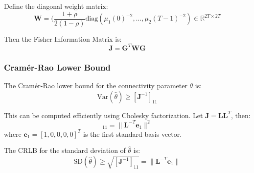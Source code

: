 Define the diagonal weight matrix:
\begin{equation*}
\mathbf{W} = (\frac{1+\rho}{2(1-\rho)} \text{diag}\left( \mu_1(0)^{-2}, \ldots, \mu_2(T-1)^{-2}\right) \in \mathbb{R}^{2T \times 2T}
\end{equation*}

Then the Fisher Information Matrix is:
\begin{equation*}
\mathbf{J} = \mathbf{G}^T \mathbf{W} \mathbf{G}
\end{equation*}

\subsubsection{Cramér-Rao Lower Bound}

The Cramér-Rao lower bound for the connectivity parameter $\theta$ is:
\begin{equation*}
\text{Var}(\hat{\theta}) \geq [\mathbf{J}^{-1}]_{11}
\end{equation*}

This can be computed efficiently using Cholesky factorization. Let $\mathbf{J} = \mathbf{L}\mathbf{L}^T$, then:
\begin{equation*}
[\mathbf{J}^{-1}]_{11} = \|\mathbf{L}^{-T}\mathbf{e}_1\|^2
\end{equation*}
where $\mathbf{e}_1 = [1, 0, 0, 0, 0]^T$ is the first standard basis vector.

The CRLB for the standard deviation of $\hat{\theta}$ is:
\begin{equation*}
\text{SD}(\hat{\theta}) \geq \sqrt{[\mathbf{J}^{-1}]_{11}} = \|\mathbf{L}^{-T}\mathbf{e}_1\|
\end{equation*}
